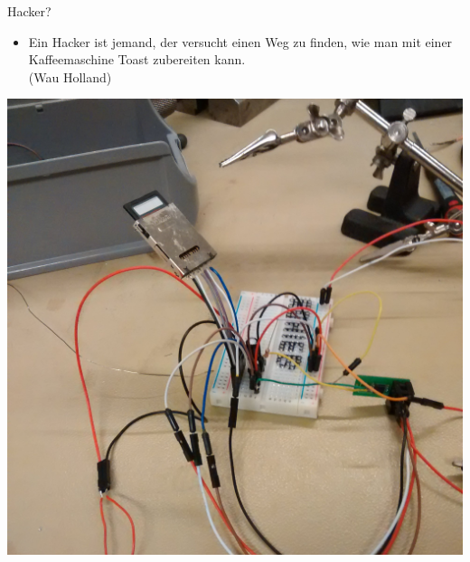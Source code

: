 \documentclass[fleqn,11pt,aspectratio=169]{beamer}
\begin{document}
\begin{frame}{Hacker?}
	\begin{multicols*}{2}
	\begin{block}{}
  \begin{itemize}
		\item Ein Hacker ist jemand, der versucht einen Weg zu finden, wie man mit einer Kaffeemaschine Toast zubereiten kann.\\ (Wau Holland)
	\end{itemize}
	\end{block}
	\centering
	\includegraphics[height=0.9\textheight]{stratum0atmusic.png}
\end{multicols*}
\end{frame}
\end{document}

